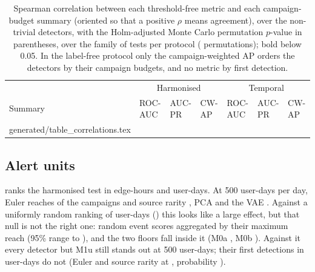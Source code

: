 \documentclass[11pt,a4paper]{article}
\makeatletter
\newcommand{\tablerows}[1]{\@@input #1 }
\makeatother
\begin{document}
\begin{table}[t]
\centering
\footnotesize
\begin{threeparttable}
\caption{Spearman correlation between each threshold-free metric and each campaign-budget summary (oriented so that a positive $\rho$ means agreement), over the non-trivial detectors, with the Holm-adjusted Monte Carlo permutation $p$-value in parentheses, over the family of \CorrelationFamily{} tests per protocol (\PermutationCount{} permutations); bold below 0.05. In the label-free protocol only the campaign-weighted AP orders the detectors by their campaign budgets, and no metric by first detection.}
\label{tab:correlations}
\setlength{\tabcolsep}{3pt}
\begin{tabular}{@{}lllllll@{}}
\toprule
& \multicolumn{3}{c}{Harmonised} & \multicolumn{3}{c}{Temporal} \\
Summary & ROC-AUC & AUC-PR & CW-AP & ROC-AUC & AUC-PR & CW-AP \\
\midrule
\tablerows{generated/table_correlations.tex}
\bottomrule
\end{tabular}
\end{threeparttable}
\end{table}

\subsection{Alert units}
\label{sec:units}
 ranks the harmonised test in edge-hours and user-days. At 500 user-days per day, Euler reaches \HarmEulerUserDayFiveHundred{} of the campaigns and source rarity \HarmSourceRarityUserDayFiveHundred{}, PCA \HarmPcaUserDayFiveHundred{} and the VAE \HarmVaeUserDayFiveHundred{}. Against a uniformly random ranking of user-days (\HarmUnitNullFiveHundred{}) this looks like a large effect, but that null is not the right one: random event scores aggregated by their maximum reach \HarmSizeNullFiveHundred{} (95\% range \HarmSizeNullFiveHundredLow{} to \HarmSizeNullFiveHundredHigh{}), and the two floors fall inside it (M0a \HarmRandomUserDayFiveHundred{}, M0b \HarmAlwaysFailUserDayFiveHundred{}). Against it every detector but M1u still stands out at 500 user-days; their first detections in user-days do not (Euler and source rarity at \HarmEulerUserDayFirst{}, probability \HarmEulerUserDaySizeNullP{}).
\end{document}

